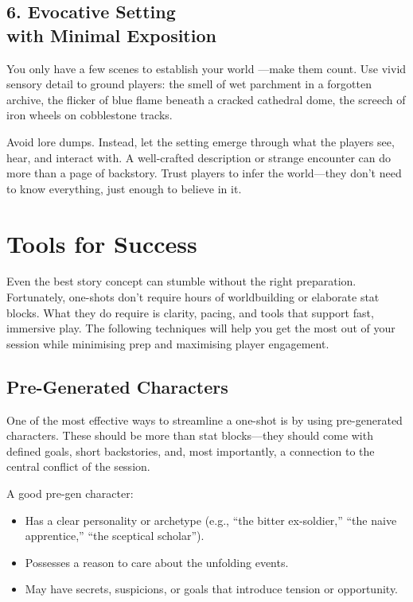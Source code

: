\subsection*{6. Evocative Setting\\ with Minimal Exposition}

You only have a few scenes to establish your world —make them count. Use vivid sensory detail to ground players: the smell of wet parchment in a forgotten archive, the flicker of blue flame beneath a cracked cathedral dome, the screech of iron wheels on cobblestone tracks.

Avoid lore dumps. Instead, let the setting emerge through what the players see, hear, and interact with. A well-crafted description or strange encounter can do more than a page of backstory. Trust players to infer the world—they don’t need to know everything, just enough to believe in it.





\section{Tools for Success}

Even the best story concept can stumble without the right preparation. Fortunately, one-shots don’t require hours of worldbuilding or elaborate stat blocks. What they do require is clarity, pacing, and tools that support fast, immersive play. The following techniques will help you get the most out of your session while minimising prep and maximising player engagement.

\subsection*{Pre-Generated Characters}

One of the most effective ways to streamline a one-shot is by using pre-generated characters. These should be more than stat blocks—they should come with defined goals, short backstories, and, most importantly, a connection to the central conflict of the session.

A good pre-gen character:
\begin{itemize}
    \item Has a clear personality or archetype (e.g., “the bitter ex-soldier,” “the naive apprentice,” “the sceptical scholar”).
    \item Possesses a reason to care about the unfolding events.
    \item May have secrets, suspicions, or goals that introduce tension or opportunity.
\end{itemize}

